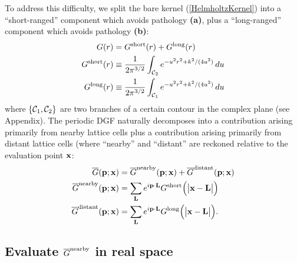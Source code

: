 \documentclass[letterpaper]{article}
\newcommand{\GB}{\overline{G}}
\begin{document}
To address this difficulty, we split the bare kernel (\ref{HelmholtzKernel}) 
into a ``short-ranged'' component which avoids 
pathology \textbf{(a)}, plus a ``long-ranged'' component
which avoids pathology \textbf{(b)}:
\begin{align}
G(r)
&= G^{\hbox{\scriptsize{short}}}(r) + G^{\hbox{\scriptsize{long}}}(r)
\\
 G^{\hbox{\scriptsize{short}}}(r)
&\equiv
 \frac{1}{2\pi^{3/2}} \int_{\mathcal{C}_2}
  e^{ -u^2 r^2 + k^2/(4u^2)} \, du
\label{GShort}
\\
 G^{\hbox{\scriptsize{long}}}(r)
&\equiv
 \frac{1}{2\pi^{3/2}} \int_{\mathcal{C}_1}
  e^{ -u^2 r^2 + k^2/(4u^2)} \, du
\label{GLong}
\end{align}
where $\{\mathcal{C}_1,\mathcal{C}_2\}$ are two branches of 
a certain contour in the complex plane (see Appendix).
The periodic DGF naturally decomposes into a contribution
arising primarily from nearby lattice cells plus a contribution
arising primarily from distant lattice cells
(where ``nearby'' and ``distant'' are reckoned relative to
the evaluation point $\mathbf{x}$:
\begin{align}
\GB(\vb p; \vb x) 
&=\GB\sups{nearby}(\vb p; \vb x) + \GB\sups{distant}(\vb p; \vb x)
\label{GBDecomposition} \\
\GB\sups{nearby}(\vb p; \vb x) 
 &= \sum_{\vb L} e^{i\vb p \cdot \vb L} 
    G\sups{short}\Big( \big |\vb x-\vb L \big| \Big)
\label{GNearby} \\
\GB\sups{distant}(\vb p; \vb x) 
 &= \sum_{\vb L} e^{i\vb p \cdot \vb L} 
    G\sups{long}\Big( \big |\vb x-\vb L \big| \Big).
\label{GDistant}
\end{align}

\subsection{Evaluate $\GB\sups{nearby}$ in real space}
\end{document}
